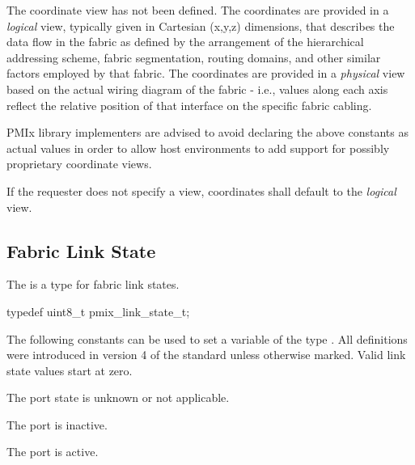 \begin{constantdesc}
%
The coordinate view has not been defined.
%
The coordinates are provided in a \emph{logical} view, typically given in Cartesian (x,y,z) dimensions, that describes the data flow in the fabric as defined by the arrangement of the hierarchical addressing scheme, fabric segmentation, routing domains, and other similar factors employed by that fabric.
%
The coordinates are provided in a \emph{physical} view based on the actual wiring diagram of the fabric - i.e., values along each axis reflect the relative position of that interface on the specific fabric cabling.
%
\end{constantdesc}

\adviceimplstart
\ac{PMIx} library implementers are advised to avoid declaring the above constants as actual  values in order to allow host environments to add support for possibly proprietary coordinate views.
\adviceimplend

If the requester does not specify a view, coordinates shall default to the \emph{logical} view.


\subsection{Fabric Link State}

The  is a  type for fabric link states.

\cspecificstart
\begin{codepar}
typedef uint8_t pmix_link_state_t;
\end{codepar}
\cspecificend

The following constants can be used to set a variable of the type . All definitions were introduced in version 4 of the standard unless otherwise marked. Valid link state values start at zero.

\begin{constantdesc}
%
The port state is unknown or not applicable.

The port is inactive.

The port is active.

\end{constantdesc}


